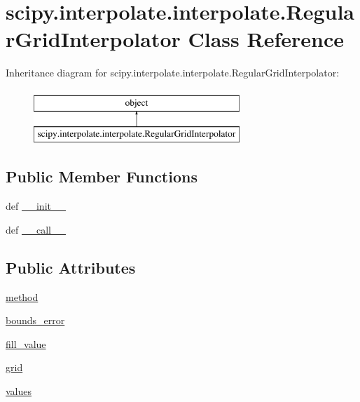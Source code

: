 \hypertarget{classscipy_1_1interpolate_1_1interpolate_1_1RegularGridInterpolator}{}\section{scipy.\+interpolate.\+interpolate.\+Regular\+Grid\+Interpolator Class Reference}
\label{classscipy_1_1interpolate_1_1interpolate_1_1RegularGridInterpolator}
Inheritance diagram for scipy.\+interpolate.\+interpolate.\+Regular\+Grid\+Interpolator\+:\begin{figure}[H]
\begin{center}
\leavevmode
\includegraphics[height=2.000000cm]{classscipy_1_1interpolate_1_1interpolate_1_1RegularGridInterpolator}
\end{center}
\end{figure}
\subsection*{Public Member Functions}
\begin{DoxyCompactItemize}
\item 
def \hyperlink{classscipy_1_1interpolate_1_1interpolate_1_1RegularGridInterpolator_aac16adfc2b6e3fa8ec1ad008e80ff0b2}{\+\_\+\+\_\+init\+\_\+\+\_\+}
\item 
def \hyperlink{classscipy_1_1interpolate_1_1interpolate_1_1RegularGridInterpolator_acfa5ae110bebc29083d4539056800b52}{\+\_\+\+\_\+call\+\_\+\+\_\+}
\end{DoxyCompactItemize}
\subsection*{Public Attributes}
\begin{DoxyCompactItemize}
\item 
\hyperlink{classscipy_1_1interpolate_1_1interpolate_1_1RegularGridInterpolator_a1c6dfe56b1299842a43ddc43ed6a2b0e}{method}
\item 
\hyperlink{classscipy_1_1interpolate_1_1interpolate_1_1RegularGridInterpolator_aab43f2fd7834b644f30de93b6a8a0155}{bounds\+\_\+error}
\item 
\hyperlink{classscipy_1_1interpolate_1_1interpolate_1_1RegularGridInterpolator_a38ab6f966f9896146ecb5e2b28010e75}{fill\+\_\+value}
\item 
\hyperlink{classscipy_1_1interpolate_1_1interpolate_1_1RegularGridInterpolator_a7944b1767b70979b680e56e692945b91}{grid}
\item 
\hyperlink{classscipy_1_1interpolate_1_1interpolate_1_1RegularGridInterpolator_ae8b5cb5ea1465c66b3d9d6f381775d50}{values}
\end{DoxyCompactItemize}


